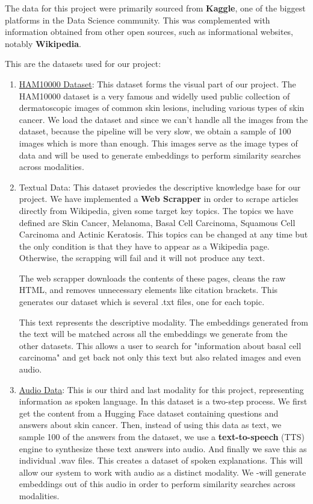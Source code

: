 \documentclass[12pt]{article}
\begin{document}
The data for this project were primarily sourced from \textbf{Kaggle}, one of the biggest platforms in the Data Science community. This was complemented with information obtained from other open sources, such as informational websites, notably \textbf{Wikipedia}.

This are the datasets used for our project:
\begin{enumerate}
    \item \href{https://huggingface.co/datasets/abaryan/ham10000_bbox}{HAM10000 Dataset}: This dataset forms the visual part of our project. The HAM10000 dataset is a very famous and widelly used public collection of dermatoscopic images of common skin lesions, including various types of skin cancer. We load the dataset and since we can't handle all the images from the dataset, because the pipeline will be very slow, we obtain a sample of 100 images which is more than enough. This images serve as the image types of data and will be used to generate embeddings to perform similarity searches across modalities.

    \item Textual Data: This dataset proviedes the descriptive knowledge base for our project. We have implemented a \textbf{Web Scrapper} in order to scrape articles directly from Wikipedia, given some target key topics. The topics we have defined are Skin Cancer, Melanoma, Basal Cell Carcinoma, Squamous Cell Carcinoma and Actinic Keratosis. This topics can be changed at any time but the only condition is that they have to appear as a Wikipedia page. Otherwise, the scrapping will fail and it will not produce any text. 
    
    The web scrapper downloads the contents of these pages, cleans the raw HTML, and removes unnecessary elements like citation brackets. This generates our dataset which is several .txt files, one for each topic. 
    
    This text represents the descriptive modality. The embeddings generated from the text will be matched across all the embeddings we generate from the other datasets. This allows a user to search for "information about basal cell carcinoma" and get back not only this text but also related images and even audio.

    \item \href{https://huggingface.co/datasets/Moaaz55/skin_cancer_questions_answers}{Audio Data}: This is our third and last modality for this project, representing information as spoken language. In this dataset is a two-step process. We first get the content from a Hugging Face dataset containing questions and answers about skin cancer. Then, instead of using this data as text, we sample 100 of the answers from the dataset, we use a \textbf{text-to-speech} (TTS) engine to synthesize these text answers into audio. And finally we save this as individual .wav files. This creates a dataset of spoken explanations. This will allow our system to work with audio as a distinct modality. We -will generate embeddings out of this audio in order to perform similarity searches across modalities.
\end{enumerate}
\end{document}
